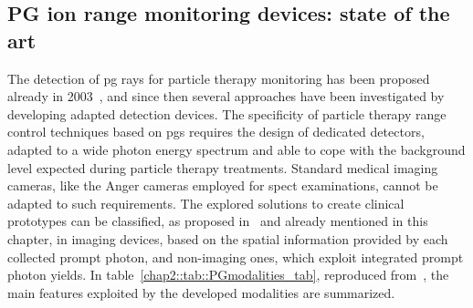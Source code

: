 \subsection{PG ion range monitoring devices: state of the art}\label{chap2::sec::PGdevices}

The detection of \gls{pg} rays for particle therapy monitoring has been proposed already in 2003~\parencite{Stichelbaut2003}, and since then several approaches have been investigated by developing adapted detection devices. The specificity of particle therapy range control techniques based on \glspl{pg} requires the design of dedicated detectors, adapted to a wide photon energy spectrum and able to cope with the background level expected during particle therapy treatments. Standard medical imaging cameras, like the Anger cameras employed for \gls{spect} examinations, cannot be adapted to such requirements. 
The explored solutions to create clinical prototypes can be classified, as proposed in~\cite{Krimmer2017} and already mentioned in this chapter, in imaging devices, based on the spatial information provided by each collected prompt photon, and non-imaging ones, which exploit integrated prompt photon yields. In table~\ref{chap2::tab::PGmodalities_tab}, reproduced from~\cite{Krimmer2017}, the main features exploited by the developed modalities are summarized.

\begin{table}[!htbp]
\centering
\caption{Characteristics of the \gls{pg} monitoring modalities. The star symbol represents mandatory measurements, the star in brackets means auxiliary but not mandatory measurements. Table reproduced from~\cite{Krimmer2017}.}
\label{chap2::tab::PGmodalities_tab}
\end{table}      

